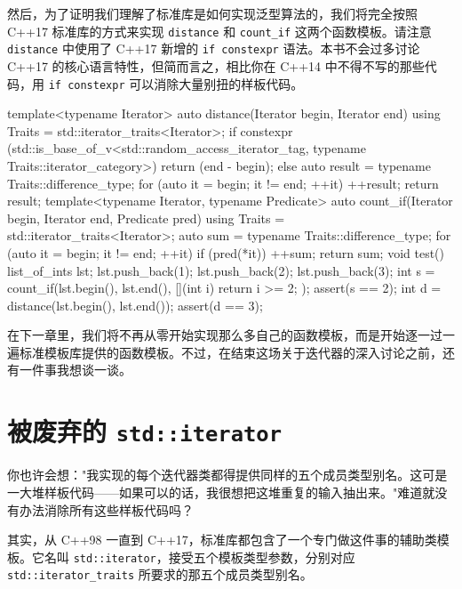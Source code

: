 然后，为了证明我们理解了标准库是如何实现泛型算法的，我们将完全按照 C++17 标准库的方式来实现 \texttt{distance} 和 \texttt{count\_\allowbreak{}if} 这两个函数模板。请注意 \texttt{distance} 中使用了 C++17 新增的 \texttt{if constexpr} 语法。本书不会过多讨论 C++17 的核心语言特性，但简而言之，相比你在 C++14 中不得不写的那些代码，用 \texttt{if constexpr} 可以消除大量别扭的样板代码。

\begin{codebox}[cpp]
    template<typename Iterator>
    auto distance(Iterator begin, Iterator end)
    {
      using Traits = std::iterator_traits<Iterator>;
      if constexpr (std::is_base_of_v<std::random_access_iterator_tag,
        typename Traits::iterator_category>) {
          return (end - begin);
        } else {
         auto result = typename Traits::difference_type{};
         for (auto it = begin; it != end; ++it) {
           ++result;
         }
         return result;
       }
    }
    template<typename Iterator, typename Predicate>
    auto count_if(Iterator begin, Iterator end, Predicate pred)
    {
      using Traits = std::iterator_traits<Iterator>;
      auto sum = typename Traits::difference_type{};
      for (auto it = begin; it != end; ++it) {
        if (pred(*it)) {
          ++sum;
        }
      }
      return sum;
    }
    void test()
    {
       list_of_ints lst;
       lst.push_back(1);
       lst.push_back(2);
       lst.push_back(3);
       int s = count_if(lst.begin(), lst.end(), [](int i){
          return i >= 2;
       });
       assert(s == 2);
       int d = distance(lst.begin(), lst.end());
       assert(d == 3);
    }
\end{codebox}

在下一章里，我们将不再从零开始实现那么多自己的函数模板，而是开始逐一过一遍标准模板库提供的函数模板。不过，在结束这场关于迭代器的深入讨论之前，还有一件事我想谈一谈。

\section{被废弃的 \texttt{std::\allowbreak{}iterator}}

你也许会想："我实现的每个迭代器类都得提供同样的五个成员类型别名。这可是一大堆样板代码——如果可以的话，我很想把这堆重复的输入抽出来。"难道就没有办法消除所有这些样板代码吗？

其实，从 C++98 一直到 C++17，标准库都包含了一个专门做这件事的辅助类模板。它名叫 \texttt{std::\allowbreak{}iterator}，接受五个模板类型参数，分别对应 \texttt{std::\allowbreak{}iterator\_\allowbreak{}traits} 所要求的那五个成员类型别名。

